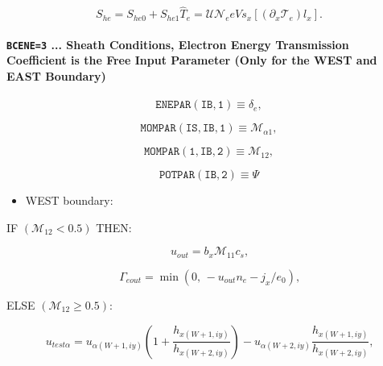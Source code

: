 \documentclass[11pt]{article}
\begin{document}
\begin{equation}
S_{he}=S_{he0}+S_{he1}\widehat{T}_{e}=\mathcal{UN}_{e}eVs_{x}\left[ \left(
\partial_{x}\mathcal{T}_{e}\right) l_{x}\right] \text{.}   \label{c180}
\end{equation}

\bigskip

\paragraph{\texttt{BCENE=3} ... Sheath Conditions, Electron Energy
Transmission Coefficient is the Free Input Parameter (Only for the WEST and
EAST Boundary)}

\bigskip

\begin{equation*}
\mathtt{ENEPAR(IB,1)}\equiv\delta_{e}, 
\end{equation*}

\begin{equation*}
\mathtt{MOMPAR(IS,IB,1)}\equiv\mathcal{M}_{\alpha1}, 
\end{equation*}

\begin{equation*}
\mathtt{MOMPAR(1,IB,2)}\equiv\mathcal{M}_{12}, 
\end{equation*}

\begin{equation*}
\mathtt{POTPAR(IB,2)}\equiv\Psi 
\end{equation*}

\bigskip

\begin{itemize}
\item  WEST boundary:
\end{itemize}

\bigskip

IF $\left( \mathcal{M}_{12}<0.5\right) $ THEN:

\begin{equation}
u_{out}=b_{x}\mathcal{M}_{11}c_{s}\text{,}   \label{c181}
\end{equation}

\begin{equation}
\Gamma_{eout}=\min\left( 0\text{, }-u_{out}n_{e}-j_{x}/e_{0}\right) \text{,} 
\label{c182}
\end{equation}

\bigskip

ELSE $\left( \mathcal{M}_{12}\geq0.5\right) $:

\begin{equation}
u_{test\alpha}=u_{\alpha\left( W+1,iy\right) }\left( 1+\frac{h_{x\left(
W+1,iy\right) }}{h_{x\left( W+2,iy\right) }}\right) -u_{\alpha\left(
W+2,iy\right) }\frac{h_{x\left( W+1,iy\right) }}{h_{x\left( W+2,iy\right) }}%
\text{,}   \label{c183}
\end{equation}
\end{document}
